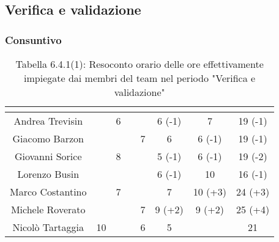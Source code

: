 \subsection{Verifica e validazione}
\subsubsection{Consuntivo}
\renewcommand{\arraystretch}{1.5}
\begin{table}[H]
\begin{center}
\begin{tabular}{|c|c|c|c|c|c|c|c|}
\hline
\rowcolor{title_row}
\textbf{\color{title_text}{Nome}} & \textbf{\color{title_text}{Resp.}} & \textbf{\color{title_text}{Ammi.}} & \textbf{\color{title_text}{Analist.}} & \textbf{\color{title_text}{Progett.}} & \textbf{\color{title_text}{Program.}} & \textbf{\color{title_text}{Verific.}} & \textbf{\color{title_text}{Totale}} \\ \hline
Andrea Trevisin  & & 6 & & & 6 (-1) & 7 & 19 (-1)  \\ \hline
Giacomo Barzon   & & & & 7 & 6 & 6 (-1) & 19 (-1)  \\ \hline
Giovanni Sorice  & & 8 & &  & 5 (-1) & 6 (-1) & 19 (-2) \\ \hline
Lorenzo Busin    & & & & & 6 (-1) & 10 & 16 (-1) \\ \hline
Marco Costantino & & 7 & & & 7 & 10 (+3) & 24 (+3) \\ \hline
Michele Roverato & & & & 7 & 9 (+2) & 9 (+2) & 25 (+4) \\ \hline
Nicolò Tartaggia & 10 & & & 6 & 5 & & 21 \\ \hline
\end{tabular}
\caption{Tabella 6.4.1(1): Resoconto orario delle ore effettivamente impiegate dai membri del team nel periodo "Verifica e validazione"\label{}}
\end{center}
\end{table}
\renewcommand{\arraystretch}{1}

